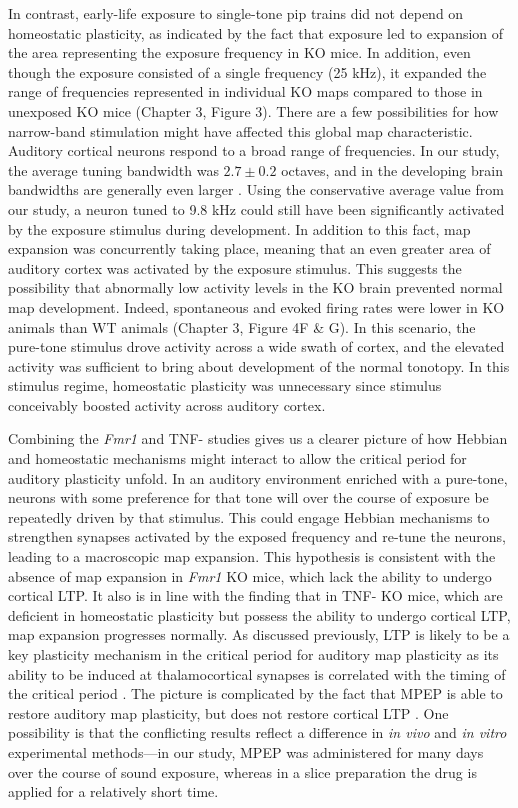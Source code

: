 In contrast, early-life exposure to single-tone pip trains did not depend on homeostatic plasticity, as indicated by the fact that exposure led to expansion of the area representing the exposure frequency in KO mice. In addition, even though the exposure consisted of a single frequency (25 kHz), it expanded the range of frequencies represented in individual KO maps compared to those in unexposed KO mice (Chapter 3, Figure 3). There are a few possibilities for how narrow-band stimulation might have affected this global map characteristic. Auditory cortical neurons respond to a broad range of frequencies. In our study, the average tuning bandwidth was $2.7\pm0.2$ octaves, and in the developing brain bandwidths are generally even larger \cite{Zhang2001}. Using the conservative average value from our study, a neuron tuned to 9.8 kHz could still have been significantly activated by the exposure stimulus during development. In addition to this fact, map expansion was concurrently taking place, meaning that an even greater area of auditory cortex was activated by the exposure stimulus. This suggests the possibility that abnormally low activity levels in the KO brain prevented normal map development. Indeed, spontaneous and evoked firing rates were lower in KO animals than WT animals (Chapter 3, Figure 4F \& G). In this scenario, the pure-tone stimulus drove activity across a wide swath of cortex, and the elevated activity was sufficient to bring about development of the normal tonotopy. In this stimulus regime, homeostatic plasticity was unnecessary since stimulus conceivably boosted activity across auditory cortex.

Combining the \textit{Fmr1} and TNF-\textalpha{} studies gives us a clearer picture of how Hebbian and homeostatic mechanisms might interact to allow the critical period for auditory plasticity unfold. In an auditory environment enriched with a pure-tone, neurons with some preference for that tone will over the course of exposure be repeatedly driven by that stimulus. This could engage Hebbian mechanisms to strengthen synapses activated by the exposed frequency and re-tune the neurons, leading to a macroscopic map expansion. This hypothesis is consistent with the absence of map expansion in \textit{Fmr1} KO mice, which lack the ability to undergo cortical LTP. It also is in line with the finding that in TNF-\textalpha{} KO mice, which are deficient in homeostatic plasticity but possess the ability to undergo cortical LTP, map expansion progresses normally. As discussed previously, LTP is likely to be a key plasticity mechanism in the critical period for auditory map plasticity as its ability to be induced at thalamocortical synapses is correlated with the timing of the critical period \cite{Chun2013}. The picture is complicated by the fact that MPEP is able to restore auditory map plasticity, but does not restore cortical LTP \cite{Wilson2007}. One possibility is that the conflicting results reflect a difference in \textit{in vivo} and \textit{in vitro} experimental methods---in our study, MPEP was administered for many days over the course of sound exposure, whereas in a slice preparation the drug is applied for a relatively short time.

